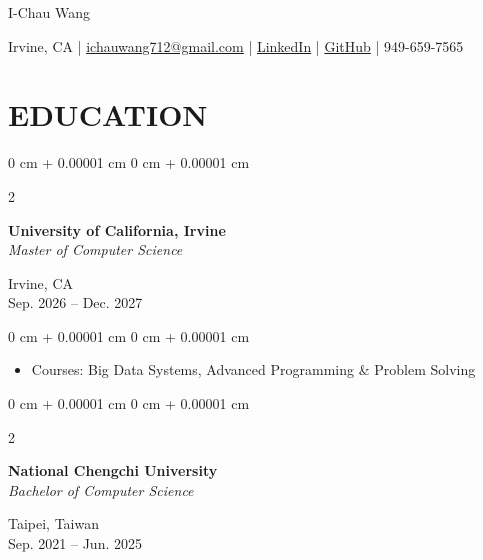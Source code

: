 \documentclass[11pt, letterpaper]{article}
\newcommand{\entrysep}{0.26cm}
\newcommand{\titlesep}{0.12cm}
\newenvironment{highlights}{
    \begin{itemize}[
        topsep=0pt,
        parsep=0pt,
        partopsep=0pt,
        itemsep=0.10cm,
        leftmargin=*,
        labelindent=10pt
    ]
}{
    \end{itemize}
} %
\newenvironment{onecolentry}{
    \begin{adjustwidth}{
        0 cm + 0.00001 cm
    }{
        0 cm + 0.00001 cm
    }
}{
    \end{adjustwidth}
} %
\newenvironment{twocolentry}[2][]{
    \onecolentry
    \def\secondColumn{#2}
    \setcolumnwidth{\fill, 4.5 cm}
    \begin{paracol}{2}
}{
    \switchcolumn \raggedleft \secondColumn
    \end{paracol}
    \endonecolentry
} %
\newenvironment{header}{
    \setlength{\topsep}{0pt}\par\kern\topsep\centering\linespread{1.5}
}{
    \par\kern\topsep
} %
\begin{document}
    \newcommand{\AND}{\unskip
        \cleaders\copy\ANDbox\hskip\wd\ANDbox
        \ignorespaces
    }
    \newsavebox\ANDbox
    \sbox\ANDbox{$|$}

    \begin{header}
        \fontsize{20pt}{20pt}\selectfont I-Chau Wang
        
        \normalsize
        Irvine, CA
        \hspace{0.15em}|\hspace{0.15em}
        \href{mailto:ichauwang712@gmail.com}{ichauwang712@gmail.com}
        \hspace{0.15em}|\hspace{0.15em}
        \href{https://linkedin.com/in/ichauwang}{LinkedIn}
        \hspace{0.15em}|\hspace{0.15em}
        \href{https://github.com/YChaoWang}{GitHub}
        \hspace{0.15em}|\hspace{0.15em}
        949-659-7565
    \end{header}

    \vspace{0.22cm}

    \section{EDUCATION}

    \begin{twocolentry}{
        Irvine, CA\\
        Sep. 2026 – Dec. 2027
    }
        \textbf{University of California, Irvine}\\
        \textit{Master of Computer Science}
    \end{twocolentry}

    \vspace{\titlesep}
    \begin{onecolentry}
        \begin{highlights}
            \item Courses: Big Data Systems, Advanced Programming \& Problem Solving
        \end{highlights}
    \end{onecolentry}

    \vspace{\entrysep}
    \begin{twocolentry}{
        Taipei, Taiwan\\
        Sep. 2021 – Jun. 2025
    }
        \textbf{National Chengchi University}\\
        \textit{Bachelor of Computer Science}
    \end{twocolentry}
\end{document}
